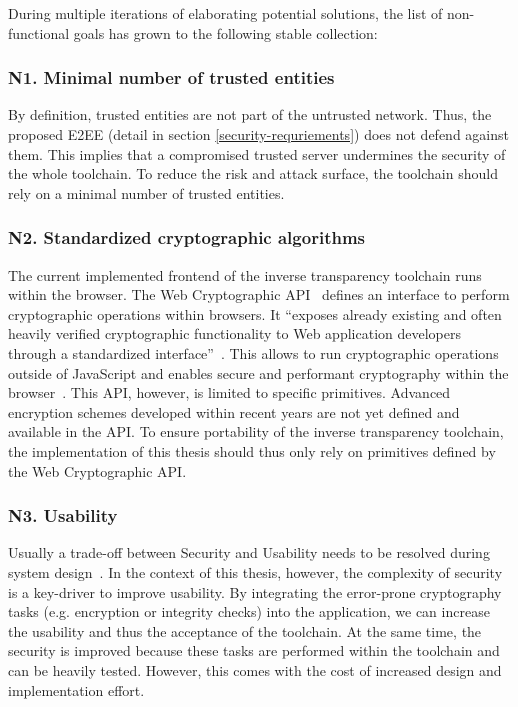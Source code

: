\documentclass[../main.tex]{subfiles}
\begin{document}
During multiple iterations of elaborating potential solutions, the list of non-functional goals has grown to the following stable collection:


\subsubsection{N1. Minimal number of trusted entities}
By definition, trusted entities are not part of the untrusted network. 
Thus, the proposed E2EE (detail in section \ref{security-requriements}) does not defend against them.
This implies that a compromised trusted server undermines the security of the whole toolchain.
To reduce the risk and attack surface, the toolchain should rely on a minimal number of trusted entities.

\subsubsection{N2. Standardized cryptographic algorithms}
The current implemented frontend of the inverse transparency toolchain runs within the browser. 
The Web Cryptographic API~\cite{WebCryptoApi2017} defines an interface to perform cryptographic operations within browsers. 
It \enquote{exposes already existing and often heavily verified cryptographic functionality to Web application developers through a standardized interface}~\cite[959]{Halpin2014}.
This allows to run cryptographic operations outside of JavaScript and enables secure and performant cryptography within the browser~\cite{Halpin2014}.
This API, however, is limited to specific primitives. 
Advanced encryption schemes developed within recent years are not yet defined and available in the API.
To ensure portability of the inverse transparency toolchain, the implementation of this thesis should thus only rely on primitives defined by the Web Cryptographic API.

\subsubsection{N3. Usability}
Usually a trade-off between Security and Usability needs to be resolved during system design~.
In the context of this thesis, however, the complexity of security is a key-driver to improve usability. 
By integrating the error-prone cryptography tasks (e.g. encryption or integrity checks) into the application, we can increase the usability and thus the acceptance of the toolchain.
At the same time, the security is improved because these tasks are performed within the toolchain and can be heavily tested.
However, this comes with the cost of increased design and implementation effort.
\end{document}
